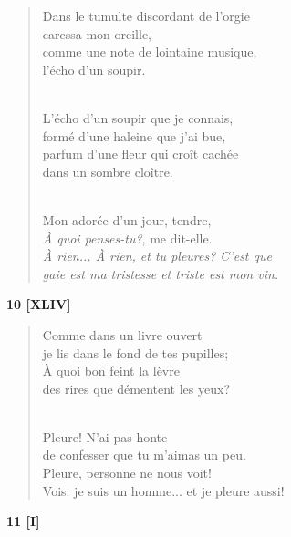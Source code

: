 \documentclass[a4paper,11pt]{book}
\begin{document}
\begin{verse}
Dans le tumulte discordant de l'orgie \\
caressa mon oreille, \\
comme une note de lointaine musique, \\
l'écho d'un soupir. \\ \

L'écho d'un soupir que je connais, \\
formé d'une haleine que j'ai bue, \\
parfum d'une fleur qui croît cachée \\
dans un sombre cloître. \\ \

Mon adorée d'un jour, tendre, \\
{\em À quoi penses-tu?\/}, me dit-elle. \\
{\em À rien... À rien, et tu pleures? C'est que \\
gaie est ma tristesse et triste est mon vin.} \\
\end{verse}

\newpage

\begin{center} {\bf 10 [XLIV]}  \end{center}

\begin{verse}
Comme dans un livre ouvert \\
je lis dans le fond de tes pupilles; \\
À quoi bon feint la lèvre \\
des rires que démentent les yeux? \\ \

Pleure! N'ai pas honte \\
de confesser que tu m'aimas un peu. \\
Pleure, personne ne nous voit! \\
Vois: je suis un homme... et je pleure aussi! \\
\end{verse}

\bigskip

\begin{center} {\bf 11 [I]} \end{center}
\end{document}
